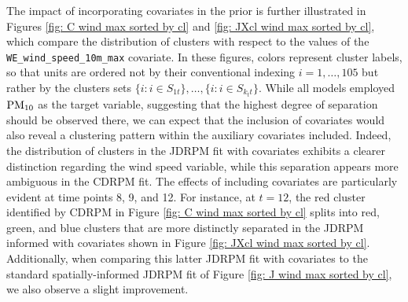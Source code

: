 \documentclass[12pt,	%
	a4paper,		%
	twoside,		%
	openright,		%
	titlepage,%
	]{book}
\theoremstyle{definition}
\begin{document}
The impact of incorporating covariates in the prior is further illustrated in Figures \ref{fig: C wind max sorted by cl} and \ref{fig: JXcl wind max sorted by cl}, which compare the distribution of clusters with respect to the values of the \texttt{WE\_wind\_speed\_10m\_max} covariate. In these figures, colors represent cluster labels, so that units are ordered not by their conventional indexing $i=1,\ldots,105$ but rather by the clusters sets $\{i : i \in S_{1t}\}, \ldots, \{i : i \in S_{k_tt}\}$. While all models employed $\text{PM}_{10}$ as the target variable, suggesting that the highest degree of separation should be observed there, we can expect that the inclusion of covariates would also reveal a clustering pattern within the auxiliary covariates included.
Indeed, the distribution of clusters in the JDRPM fit with covariates exhibits a clearer distinction regarding the wind speed variable, while this separation appears more ambiguous in the CDRPM fit. The effects of including covariates are particularly evident at time points 8, 9, and 12. For instance, at $t=12$, the red cluster identified by CDRPM in Figure \ref{fig: C wind max sorted by cl} splits into red, green, and blue clusters that are more distinctly separated in the JDRPM informed with covariates shown in Figure \ref{fig: JXcl wind max sorted by cl}. Additionally, when comparing this latter JDRPM fit with covariates to the standard spatially-informed JDRPM fit of Figure \ref{fig: J wind max sorted by cl}, we also observe a slight improvement.
\end{document}
